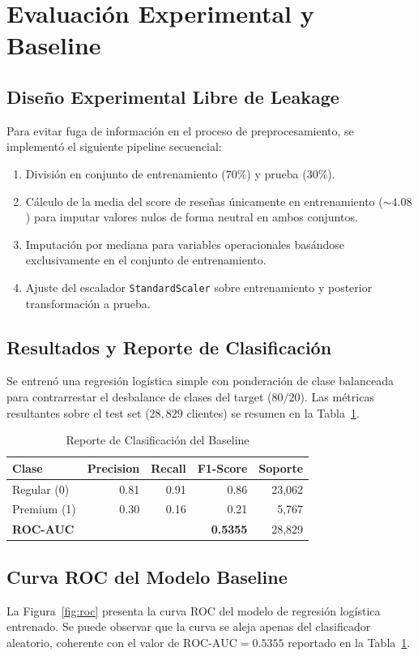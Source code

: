 \documentclass[journal,letterpaper]{IEEEtran}
\begin{document}
\section{Evaluación Experimental y Baseline}
\subsection{Diseño Experimental Libre de Leakage}
Para evitar fuga de información en el proceso de preprocesamiento, se implementó el siguiente pipeline secuencial:
\begin{enumerate}
    \item División en conjunto de entrenamiento ($70\%$) y prueba ($30\%$).
    \item Cálculo de la media del score de reseñas únicamente en entrenamiento ($\sim 4.08$) para imputar valores nulos de forma neutral en ambos conjuntos.
    \item Imputación por mediana para variables operacionales basándose exclusivamente en el conjunto de entrenamiento.
    \item Ajuste del escalador \texttt{StandardScaler} sobre entrenamiento y posterior transformación a prueba.
\end{enumerate}

\subsection{Resultados y Reporte de Clasificación}
Se entrenó una regresión logística simple con ponderación de clase balanceada para contrarrestar el desbalance de clases del target ($80/20$). Las métricas resultantes sobre el test set ($28,829$ clientes) se resumen en la Tabla~\ref{tab:metrics}.

\begin{table}[h]
\centering
\caption{Reporte de Clasificación del Baseline}
\label{tab:metrics}
\begin{tabular}{lrrrr}
\toprule
Clase & Precision & Recall & F1-Score & Soporte \\
\midrule
Regular (0) & 0.81 & 0.91 & 0.86 & 23,062 \\
Premium (1) & 0.30 & 0.16 & 0.21 & 5,767 \\
\midrule
\textbf{ROC-AUC} & & & \textbf{0.5355} & 28,829 \\
\bottomrule
\end{tabular}
\end{table}

\subsection{Curva ROC del Modelo Baseline}
La Figura~\ref{fig:roc} presenta la curva ROC del modelo de regresión logística entrenado. Se puede observar que la curva se aleja apenas del clasificador aleatorio, coherente con el valor de $\text{ROC-AUC} = 0.5355$ reportado en la Tabla~\ref{tab:metrics}.
\end{document}
